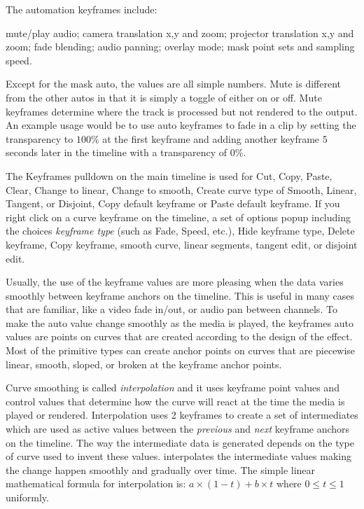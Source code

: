 The automation keyframes include:

mute/play audio; camera translation x,y and zoom; projector translation x,y and zoom; fade blending; audio panning; overlay mode; mask point sets and sampling speed.

Except for the mask auto, the values are all simple numbers.  Mute is different from the other autos in that it is simply a toggle of either on or off.  Mute keyframes determine where the track is processed but not rendered to the output.  An example usage would be to use auto keyframes to fade in a clip by setting the transparency to $100\%$ at the first keyframe and adding another keyframe 5 seconds later in the timeline with a transparency of $0\%$.

The Keyframes pulldown on the main timeline is used for Cut, Copy, Paste, Clear, Change to linear, Change to smooth, Create curve type of Smooth, Linear, Tangent, or Disjoint, Copy default keyframe or Paste default keyframe.  If you right click on a curve keyframe on the timeline, a set of options popup including the choices \textit{keyframe type} (such as Fade, Speed, etc.), Hide keyframe type, Delete keyframe, Copy keyframe, smooth curve, linear segments, tangent edit, or disjoint edit.

Usually, the use of the keyframe values are more pleasing when the data varies smoothly between keyframe anchors on the timeline.  This is useful in many cases that are familiar, like a video fade in/out, or audio pan between channels.  To make the auto value change smoothly as the media is played, the keyframes auto values are points on curves that are created according to the design of the effect.  Most of the primitive types can create anchor points on curves that are piecewise linear, smooth, sloped, or broken at the keyframe anchor points.

Curve smoothing is called \textit{interpolation} and it uses keyframe point values and control values that determine how the curve will react at the time the media is played or rendered.  Interpolation uses 2 keyframes to create a set of intermediates which are used as active values between the \textit{previous} and \textit{next} keyframe anchors on the timeline.  The way the intermediate data is generated depends on the type of curve used to invent these values.  \CGG{} interpolates the intermediate values making the change happen smoothly and gradually over time.  The simple linear mathematical formula for interpolation is:   $a\times(1-t) + b\times t$    where $0\le t\le 1$ uniformly.

